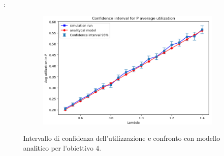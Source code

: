 \begin{frame}{\subsecname: \subsubsecname}
\begin{figure}
        \begin{subfigure}{0.35\linewidth}
            \centering
            \includegraphics[width=\linewidth]{figs/results/obj4/obj4-utilizzazione-P.png}
            \label{fig:obj4_line_utilization_P}
        \end{subfigure}
        \caption{Intervallo di confidenza dell'utilizzazione e confronto con modello analitico per l'obiettivo 4.}
        \label{fig:obj4_lineplots_utilization}
    \end{figure}   
\end{frame}


